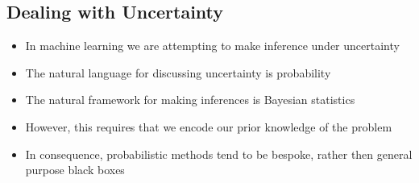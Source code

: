 \begin{slide}
\section{Dealing with Uncertainty}

\begin{PauseHighLight}
  \begin{itemize}
  \item In machine learning we are attempting to make inference under
    uncertainty\pause 
  \item The natural language for discussing uncertainty is
    probability\pause
  \item The natural framework for making inferences is Bayesian
    statistics\pause
  \item However, this requires that we encode our prior knowledge of the
    problem\pause
  \item In consequence, probabilistic methods tend to be bespoke, rather
    then general purpose black boxes\pause
  \end{itemize}
\end{PauseHighLight}

\end{slide}


